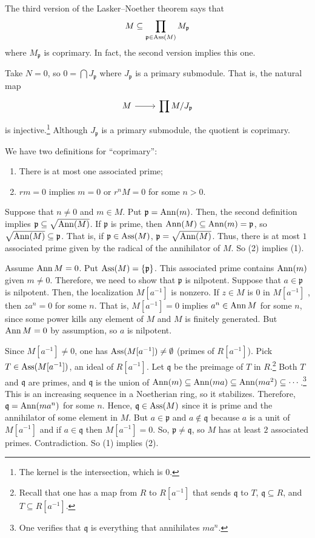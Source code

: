 \documentclass [11 pt, oneside] {article}
\begin{document}
The third version of the Lasker--Noether theorem says that
\begin{align*}
	M \subseteq \prod_{\mathfrak{p}\in \operatorname{Ass} (M)} M_{\mathfrak{p}}
\end{align*}
where $M_{\mathfrak{p}}$ is coprimary. In fact, the second version implies this one. 

Take $N=0$, so $0 = \bigcap J_{\mathfrak{p} }$ where $J_{\mathfrak{p}}$ is a primary submodule. That is, the natural map 
\[
\begin{tikzcd}
M \ar[r] &\displaystyle \prod M/J_{\mathfrak{p}}
\end{tikzcd}
\]
is injective.\footnote{The kernel is the intersection, which is $0$.} Although $J_{\mathfrak{p}}$ is a primary submodule, the quotient is coprimary.

We have two definitions for ``coprimary'':
\begin{enumerate}
	\item There is at most one associated prime;
	\item $rm = 0$ implies $m=0$ or $r^nM=0$ for some $n>0$.
\end{enumerate}

Suppose that $n\ne 0$ and $m\in M$. Put $\mathfrak{p} = \operatorname{Ann}(m)$. Then, the second definition implies $\mathfrak{p} \subseteq \sqrt{\operatorname{Ann} (M)} $. If $\mathfrak{p}$ is prime, then $\operatorname{Ann}(M)\subseteq \operatorname{Ann} (m)= \mathfrak{p}$, so $\sqrt{\operatorname{Ann}(M)}\subseteq \mathfrak{p} $. That is, if $\mathfrak{p}\in \operatorname{Ass} (M)$, $\mathfrak{p} = \sqrt{\operatorname{Ann} (M)} $. Thus, there is at most $1$ associated prime given by the radical of the annihilator of $M$. So (2) implies (1).

Assume $\operatorname{Ann} M=0$. Put $\operatorname{Ass} (M) = \{\mathfrak{p}\}$. This associated prime contains $\operatorname{Ann} (m)$ given $m\ne 0$. Therefore, we need to show that $\mathfrak{p}$ is nilpotent. Suppose that $a\in \mathfrak{p}$ is nilpotent. Then, the localization $M[a^{-1}]$ is nonzero. If $z\in M$ is $0$ in $M[a^{-1}]$ , then $za^n=0$ for some $n$. That is, $M[a^{-1}]=0$ implies $a^n \in \operatorname{Ann} M$ for some $n$, since some power kills any element of $M$ and $M$ is finitely generated. But $\operatorname{Ann} M=0$ by assumption, so $a$ is nilpotent. 

Since $M[a^{-1}]\ne 0$, one has $\operatorname{Ass} (M[a^{-1}])\ne \emptyset$ (primes of $R[a^{-1}]$). Pick $T\in \operatorname{Ass} (M[a^{-1}])$, an ideal of $R[a^{-1}]$. Let $\mathfrak{q}$ be the preimage of $T$ in $R$.\footnote{Recall that one has a map from $R$ to $R[a^{-1}]$ that sends $\mathfrak{q}$ to $T$, $\mathfrak{q}\subseteq R$, and $T\subseteq R[a^{-1}]$.} Both $T$ and $\mathfrak{q}$ are primes, and $\mathfrak{q}$ is the union of $\operatorname{Ann}(m)\subseteq \operatorname{Ann} (ma)\subseteq \operatorname{Ann} (ma^2)\subseteq \cdots$.\footnote{One verifies that $\mathfrak{q}$ is everything that annihilates $ma^n$.} This is an increasing sequence in a Noetherian ring, so it stabilizes. Therefore, $\mathfrak{q}=\operatorname{Ann}(ma^n)$ for some $n$. Hence, $\mathfrak{q}\in \operatorname{Ass}(M)$ since it is prime and the annihilator of some element in $M$. But $a\in \mathfrak{p}$ and $a\notin \mathfrak{q}$ because $a$ is a unit of $M[a^{-1}]$ and if $a\in \mathfrak{q}$ then $M[a^{-1}]=0$. So, $\mathfrak{p}\ne \mathfrak{q}$, so $M$ has at least $2$ associated primes. Contradiction. So (1) implies (2).
\end{document}
